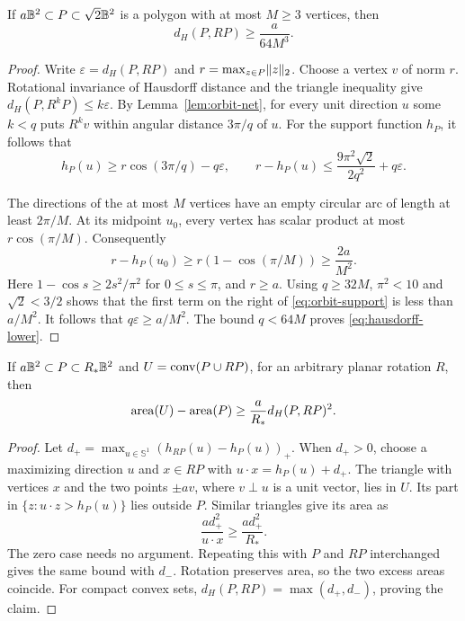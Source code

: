 \begin{lemma}
\label{lem:hausdorff}
If $a\mathbb B^2\subset P\subset\sqrt2\mathbb B^2$ is a polygon with at most
$M\ge3$ vertices, then
\begin{equation}\label{eq:hausdorff-lower}
                         d_H(P,RP)\ge\frac{a}{64M^3}.
\end{equation}
\end{lemma}
\begin{proof}
Write $\varepsilon=d_H(P,RP)$ and $r=\max_{z\in P}\lVert z\rVert_2$.
Choose a vertex $v$ of norm $r$. Rotational invariance of Hausdorff
distance and the triangle inequality give
$d_H(P,R^kP)\le k\varepsilon$.
By Lemma~\ref{lem:orbit-net}, for every unit direction $u$ some $k<q$
puts $R^kv$ within angular distance $3\pi/q$ of $u$. For the support
function $h_P$, it follows that
\begin{equation}\label{eq:orbit-support}
 h_P(u)\ge r\cos(3\pi/q)-q\varepsilon,
 \qquad r-h_P(u)\le\frac{9\pi^2\sqrt2}{2q^2}+q\varepsilon.
\end{equation}

The directions of the at most $M$ vertices have an empty circular arc
of length at least $2\pi/M$. At its midpoint $u_0$, every vertex has
scalar product at most $r\cos(\pi/M)$. Consequently
\[
 r-h_P(u_0)\ge r(1-\cos(\pi/M))\ge\frac{2a}{M^2}.
\]
Here $1-\cos s\ge2s^2/\pi^2$ for $0\le s\le\pi$, and $r\ge a$.
Using $q\ge32M$, $\pi^2<10$ and $\sqrt2<3/2$ shows that the first
term on the right of \eqref{eq:orbit-support} is less than $a/M^2$.
It follows that $q\varepsilon\ge a/M^2$.
The bound $q<64M$ proves \eqref{eq:hausdorff-lower}.
\end{proof}

\begin{lemma}\label{lem:area}
If $a\mathbb B^2\subset P\subset R_*\mathbb B^2$ and $U=\operatorname{conv}(P\cup RP)$, for
an arbitrary planar rotation $R$, then
\begin{equation}\label{eq:area-hausdorff}
           \operatorname{area}(U)-\operatorname{area}(P)\ge\frac{a}{R_*}d_H(P,RP)^2.
\end{equation}
\end{lemma}
\begin{proof}
Let $d_+=\max_{u\in\mathbb S^1}(h_{RP}(u)-h_P(u))_+$.
When $d_+>0$, choose a maximizing direction $u$ and $x\in RP$ with
$u\cdot x=h_P(u)+d_+$. The triangle with vertices $x$ and the two
points $\pm av$, where $v\perp u$ is a unit vector, lies in $U$.
Its part in $\{z:u\cdot z>h_P(u)\}$ lies outside $P$. Similar
triangles give its area as
\[
            \frac{a d_+^2}{u\cdot x}\ge\frac{a d_+^2}{R_*}.
\]
The zero case needs no argument. Repeating this with $P$ and $RP$
interchanged gives the same bound with $d_-$. Rotation preserves area,
so the two excess areas coincide. For compact convex sets,
$d_H(P,RP)=\max(d_+,d_-)$, proving the claim.
\end{proof}

